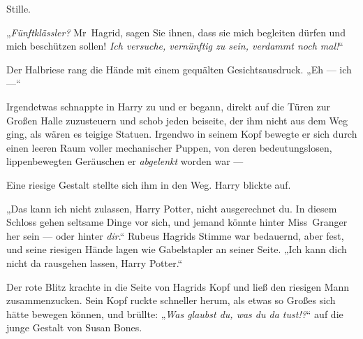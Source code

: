Stille.

„\emph{Fünftklässler?} Mr~Hagrid, sagen Sie ihnen, dass sie mich begleiten dürfen und mich beschützen sollen! \emph{Ich versuche, vernünftig zu sein, verdammt noch mal!}“

Der Halbriese rang die Hände mit einem gequälten Gesichtsausdruck.
„Eh — ich —“

Irgendetwas schnappte in Harry zu und er begann, direkt auf die Türen zur Großen Halle zuzusteuern und schob jeden beiseite, der ihm nicht aus dem Weg ging, als wären es teigige Statuen. Irgendwo in seinem Kopf bewegte er sich durch einen leeren Raum voller mechanischer Puppen, von deren bedeutungslosen, lippenbewegten Geräuschen er \emph{abgelenkt} worden war —


Eine riesige Gestalt stellte sich ihm in den Weg. Harry blickte auf.

„Das kann ich nicht zulassen, Harry Potter, nicht ausgerechnet du. In diesem Schloss gehen seltsame Dinge vor sich, und jemand könnte hinter Miss~Granger her sein — oder hinter \emph{dir}.“
Rubeus Hagrids Stimme war bedauernd, aber fest, und seine riesigen Hände lagen wie Gabelstapler an seiner Seite.
„Ich kann dich nicht da rausgehen lassen, Harry Potter.“


Der rote Blitz krachte in die Seite von Hagrids Kopf und ließ den riesigen Mann zusammenzucken. Sein Kopf ruckte schneller herum, als etwas so Großes sich hätte bewegen können, und brüllte:
„\emph{Was glaubst du, was du da tust!?}“ auf die junge Gestalt von Susan Bones.

